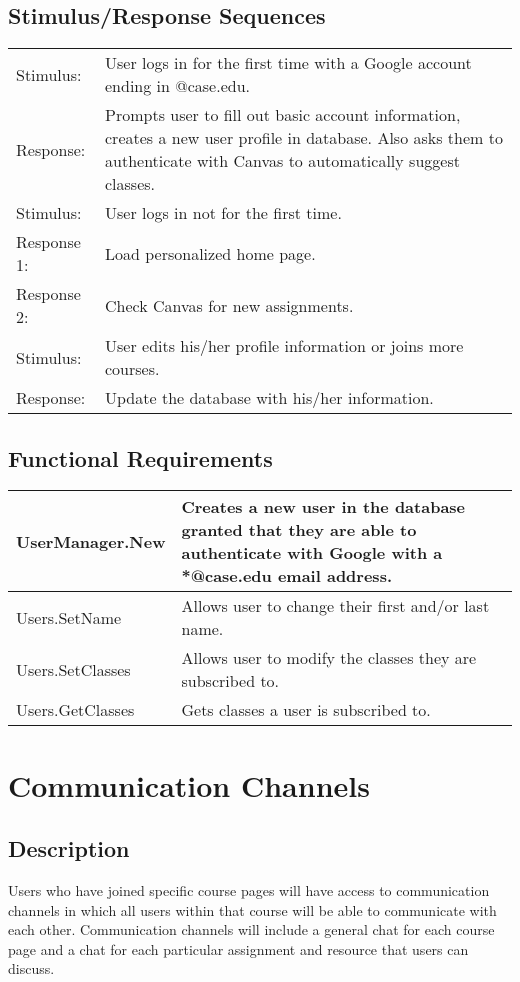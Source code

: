 \documentclass{scrreprt}
\begin{document}
\subsection{Stimulus/Response Sequences}
\begin{tabular}{| p{2cm} | p{12cm} | }
	\hline
	Stimulus:   & User logs in for the first time with a Google account ending in @case.edu. \\
	Response:   & Prompts user to fill out basic account information, creates a new user profile in database. Also asks them to authenticate with Canvas to automatically suggest classes. \\ \hline
	Stimulus:   & User logs in not for the first time. \\
	Response 1: & Load personalized home page. \\
	Response 2: & Check Canvas for new assignments. \\ \hline
	Stimulus:   & User edits his/her profile information or joins more courses. \\
	Response:   & Update the database with his/her information. \\
	\hline
\end{tabular}

\subsection{Functional Requirements}

\begin{tabular}{| p{3cm} | p{11cm} |}
\hline
UserManager.New & Creates a new user in the database granted that they are able to authenticate with Google with a *@case.edu email address. \\ \hline
Users.SetName & Allows user to change their first and/or last name. \\ \hline
Users.SetClasses & Allows user to modify the classes they are subscribed to. \\ \hline
Users.GetClasses & Gets classes a user is subscribed to. \\
\hline
\end{tabular}

\section{Communication Channels}
\subsection{Description}
Users who have joined specific course pages will have access to communication channels in which all users within that course will be able to communicate with each other. Communication channels will include a general chat for each course page and a chat for each particular assignment and resource that users can discuss.
\end{document}
